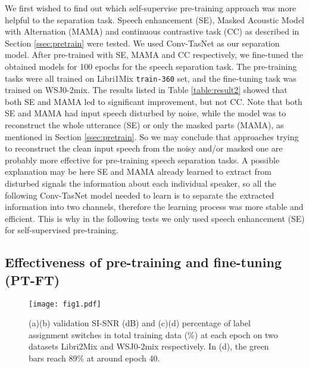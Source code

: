 \documentclass[a4paper]{article}
\begin{document}
We first wished to find out which self-supervise pre-training approach was more helpful to the separation task.
Speech enhancement (SE), Masked Acoustic Model with Alternation (MAMA) and continuous contrastive task (CC) as described in Section \ref{ssec:pretrain} were tested.
We used Conv-TasNet as our separation model.
After pre-trained with SE, MAMA and CC respectively, we fine-tuned the obtained models for 100 epochs for the speech separation task.
The pre-training tasks were all trained on Libri1Mix \texttt{train-360} set, and the fine-tuning task was trained on WSJ0-2mix.
The results listed in Table \ref{table:result2} showed that both SE and MAMA led to significant improvement, but not CC.
Note that both SE and MAMA had input speech disturbed by noise, while the model was to reconstruct the whole utterance (SE) or only the masked parts (MAMA), as mentioned in Section \ref{ssec:pretrain}.
So we may conclude that approaches trying to reconstruct the clean input speech from the noisy and/or masked one are probably more effective for pre-training speech separation tasks.
A possible explanation may be here SE and MAMA already learned to extract from disturbed signals the information about each individual speaker, so all the following Conv-TasNet model needed to learn is to separate the extracted information into two channels, therefore the learning process was more stable and efficient.
This is why in the following tests we only used speech enhancement (SE) for self-supervised pre-training.

\subsection{Effectiveness of pre-training and fine-tuning (PT-FT)}
\label{ssec:results-wsj-libri}
\begin{figure*}[hbt!]
    \centering
    \texttt{[image: fig1.pdf]}
    \caption{
        (a)(b) validation SI-SNR (dB) and (c)(d) percentage of label assignment switches in total training data (\%) at each epoch on two datasets Libri2Mix and WSJ0-2mix respectively.
        In (d), the green bars reach 89\% at around epoch 40.}
    \label{fig:result}
    \vspace{-0.5cm}
\end{figure*}
\end{document}
